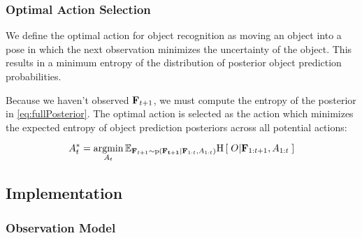 \subsubsection{Optimal Action Selection}

            We define the optimal action for object recognition as moving an object into a pose in which the next observation minimizes the uncertainty of the object. This results in a minimum entropy of the distribution of posterior object prediction probabilities. 

            Because we haven't observed $\mathbf{F}_{t+1}$, we must compute the  entropy of the posterior in \eqref{eq:fullPosterior}. The optimal action is selected as the action which minimizes the expected entropy of object prediction posteriors across all potential actions:
            
            
            {
            \begin{equation}
            \label{eq:optimalAction}
            \small                
                A_t^* = \argmin_{A_t} \expectedValue{ \entropy{O|\set{F}_{1:t+1},A_{1:t}} }{\set{F}_{t+1} \sim \prob{\set{F_{t+1}}|\set{F}_{1:t},A_{1:t}}}
                \vspace{-2ex}
            \end{equation}
            }
            
            \vspace{-1ex}
    \subsection{Implementation}
        \subsubsection{Observation Model}

 
